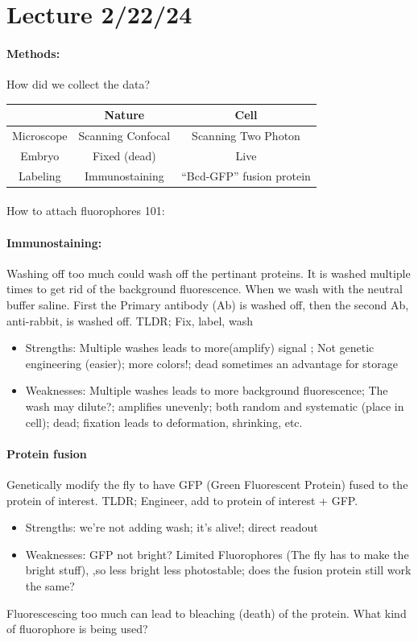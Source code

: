 \documentclass[../main.tex]{subfiles}
\begin{document}
\newpage
\section*{Lecture 2/22/24}
\barh \vspace{10px}

\paragraph*{Methods:} How did we collect the data?
\begin{table}[ht]
    \centering
    \begin{tabular}{c c c}
        & Nature & Cell \\
        \hline 
        Microscope & Scanning Confocal & Scanning Two Photon \\
        Embryo & Fixed (dead) & Live \\
        Labeling & Immunostaining & ``Bcd-GFP'' fusion protein \\
    \end{tabular}
\end{table}
\paragraph*{}
How to attach fluorophores 101:
\paragraph*{Immunostaining:} Washing off too much could wash off the pertinant proteins. It is
washed multiple times to get rid of the background fluorescence. When we wash with the neutral
buffer saline. First the Primary antibody (Ab) is washed off, then the second Ab, anti-rabbit, is
washed off. TLDR; Fix, label, wash
\begin{itemize}
    \item Strengths: Multiple washes leads to more(amplify) signal
    ; Not genetic engineering (easier); more colors!; dead sometimes an advantage for
    storage

    \item Weaknesses: Multiple washes leads to more background fluorescence; The wash may dilute?;
    amplifies unevenly; both random and systematic (place in cell); dead; fixation leads to
    deformation, shrinking, etc.
\end{itemize}
\paragraph*{Protein fusion} Genetically modify the fly to have GFP (Green Fluorescent Protein) fused
to the protein of interest. TLDR; Engineer, add to protein of interest + GFP.
\begin{itemize}
    \item Strengths: we're not adding wash; it's alive!; direct readout
    \item Weaknesses: GFP not bright? Limited Fluorophores (The fly has to make the bright stuff), 
    ,so less bright less photostable; does the fusion protein still work the same?
\end{itemize}
Fluorescescing too much can lead to bleaching (death) of the protein. What kind of fluorophore is
being used?
\end{document}
